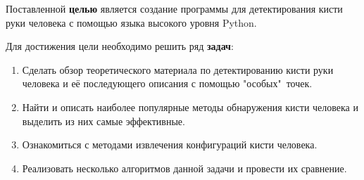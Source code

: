 
Поставленной {\bf целью} является создание программы для детектирования кисти руки человека 
с помощью языка высокого уровня Python.

Для достижения цели необходимо решить ряд {\bf задач}:
\begin{enumerate}
	\item Сделать обзор теоретического материала по детектированию кисти руки человека и 
её последующего описания с помощью "особых"\ точек.
	\item Найти и описать наиболее популярные методы обнаружения кисти человека и выделить из них самые эффективные.
	\item Ознакомиться с методами извлечения конфигураций кисти человека.
	\item Реализовать несколько алгоритмов данной задачи и провести их сравнение.
\end{enumerate}